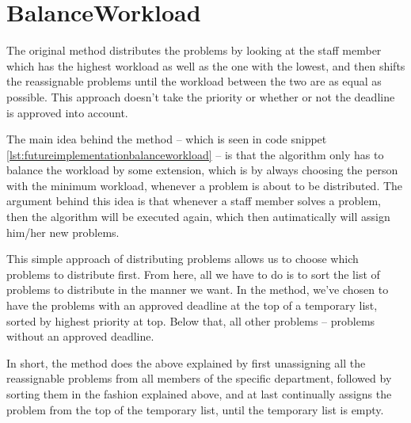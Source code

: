 \section{BalanceWorkload}
\label{sec:futureimplementationbalanceworkload}

The original  method distributes the problems by looking at the staff member which has the highest workload as well as the one with the lowest, and then shifts the reassignable problems until the workload between the two are as equal as possible. This approach doesn't take the priority or whether or not the deadline is approved into account. 

The main idea behind the  method -- which is seen in code snippet \ref{lst:futureimplementationbalanceworkload} -- is that the algorithm only has to balance the workload by some extension, which is by always choosing the person with the minimum workload, whenever a problem is about to be distributed. The argument behind this idea is that whenever a staff member solves a problem, then the algorithm will be executed again, which then autimatically will assign him/her new problems.

This simple approach of distributing problems allows us to choose which problems to distribute first. From here, all we have to do is to sort the list of problems to distribute in the manner we want. In the  method, we've chosen to have the problems with an approved deadline at the top of a temporary list, sorted by highest priority at top. Below that, all other problems -- problems without an approved deadline.

In short, the  method does the above explained by first unassigning all the reassignable problems from all members of the specific department, followed by sorting them in the fashion explained above, and at last continually assigns the problem from the top of the temporary list, until the temporary list is empty.

